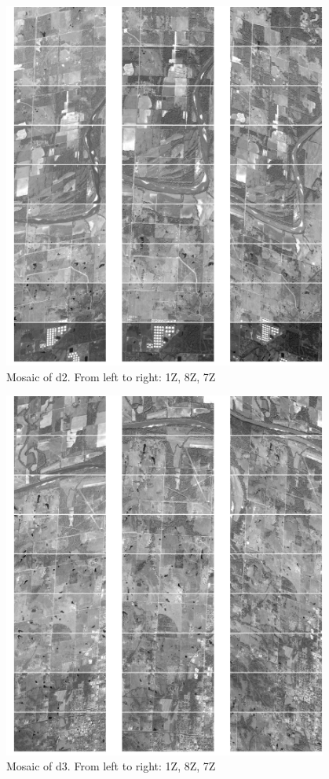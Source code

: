 \documentclass[paper=a4, fontsize=11pt, onecolumn, tikz, dvipsnames, svgnames, x11names]{article}
\begin{document}
 \newpage
 \begin{figure}[H]
     \centering
     \includegraphics[width = 0.95\textwidth]{d2.png}
     \caption{Mosaic of d2. From left to right: 1Z, 8Z, 7Z}
     \label{fig_mosaic_d2}
 \end{figure}

 \newpage
 \begin{figure}[H]
     \centering
     \includegraphics[width = 0.95\textwidth]{d3.png}
     \caption{Mosaic of d3. From left to right: 1Z, 8Z, 7Z}
     \label{fig_mosaic_d3}
 \end{figure}
\end{document}
